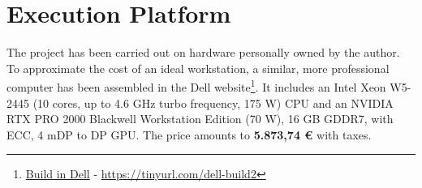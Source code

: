 \section{Execution Platform}
The project has been carried out on hardware personally owned by the author.
To approximate the cost of an ideal workstation, a similar, more professional computer has been assembled in the Dell website\footnote{\href{https://www.dell.com/es-es/shop/cty/pdp/spd/precision-5860-workstation/xctopt5860emea_vp?configurationid=7a5eeb22-2eb6-4b6c-9520-c7198c3efe48\#m_146} {Build in Dell} - \url{https://tinyurl.com/dell-build2}}.
It includes an Intel Xeon W5-2445 (10 cores, up to 4.6 GHz turbo frequency, 175 W) CPU and an NVIDIA RTX PRO 2000 Blackwell Workstation Edition (70 W), 16 GB GDDR7, with ECC, 4 mDP to DP GPU.
The price amounts to \textbf{5.873,74 €} with taxes.